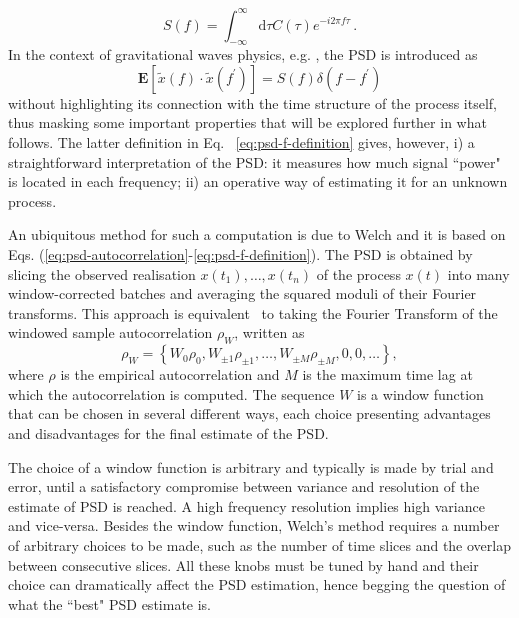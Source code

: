 \documentclass[epj,nopacs]{svjour}
\begin{document}
\begin{equation}\label{eq:psd-autocorrelation}
	S(f) = \int_{-\infty}^{\infty} \textrm{d}\tau C(\tau) e^{-i 2 \pi f \tau}\,.
\end{equation}
In the context of gravitational waves physics, e.g. \cite{Finn_1992}, the PSD is introduced as  
\begin{equation}\label{eq:psd-f-definition}
	\mathbf{E}[\tilde{x}(f) \cdot \tilde{x}(f^\prime)] = S(f) \delta(f-f^\prime)
\end{equation}
without highlighting its connection with the time structure of the process itself, thus masking some important properties that will be explored further in what follows. The latter definition in Eq. ~\eqref{eq:psd-f-definition} gives, however, i) a straightforward interpretation of the PSD: it measures how much signal ``power" is located in each frequency; ii) an operative way of estimating it for an unknown process.  

An ubiquitous method for such a computation is due to Welch \cite{Welch1967} and it is based on Eqs. (\ref{eq:psd-autocorrelation}-\ref{eq:psd-f-definition}).
The PSD is obtained by slicing the observed realisation $x(t_1),\ldots,x(t_n)$ of the process $x(t)$ into many window-corrected batches and averaging the squared moduli of their Fourier transforms.
This approach is equivalent~\cite{Lomb}\cite{Scargle} to taking the Fourier Transform of the windowed sample autocorrelation $\rho_W$, written as
\begin{equation}
    \rho_{W} = \left\{W_0\rho_0,W_{\pm 1}\rho_{\pm 1}, \dots, W_{\pm M}\rho_{\pm M}, 0, 0, \dots \right\},
\end{equation}
where $\rho$ is the empirical autocorrelation and $M$ is the maximum time lag at which the autocorrelation is computed.
The sequence $W$ is a window function that can be chosen in several different ways, each choice presenting advantages and disadvantages for the final estimate of the PSD.

The choice of a window function is arbitrary and typically is made by trial and error, until a satisfactory compromise between variance and resolution of the estimate of PSD is reached. A high frequency resolution implies high variance and vice-versa.
Besides the window function, Welch's method requires a number of arbitrary choices to be made, such as the number of time slices and the overlap between consecutive slices. All these knobs must be tuned by hand and their choice can dramatically affect the PSD estimation, hence begging the question of what the ``best" PSD estimate is.
\end{document}
